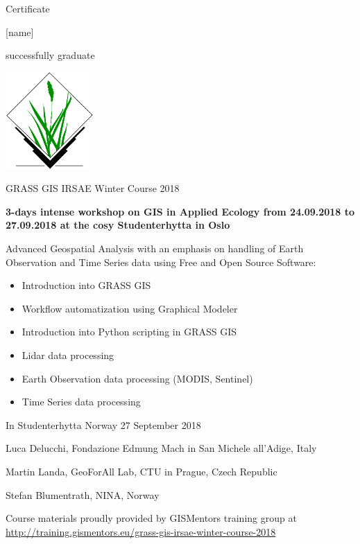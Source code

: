 \documentclass[12pt, a4paper]{letter}
\begin{document}
\pagestyle{empty}
\begin{center}

{\Huge Certificate}

{\Large [name]}

successfully graduate

\includegraphics[width=0.25\textwidth]{./grasslogo_vector.pdf}

{\Large GRASS GIS IRSAE Winter Course 2018}

{\bf 3-days intense workshop on GIS in Applied Ecology from 24.09.2018 to
27.09.2018 at the cosy Studenterhytta in Oslo}
\end{center}

Advanced Geospatial Analysis with an emphasis on handling of Earth
Observation and Time Series data using Free and Open Source Software:

\begin{itemize}
    \item Introduction into GRASS GIS
    \item Workflow automatization using Graphical Modeler
    \item Introduction into Python scripting in GRASS GIS
    \item Lidar data processing
    \item Earth Observation data processing (MODIS, Sentinel)
    \item Time Series data processing
\end{itemize}

\vfill

    In Studenterhytta Norway 27 September 2018\\

\vfill

    Luca Delucchi, Fondazione Edmung Mach in San Michele all’Adige, Italy

\vfill
    
    Martin Landa, GeoForAll Lab, CTU in Prague, Czech Republic
    
\vfill

    Stefan Blumentrath, NINA, Norway \\

\vfill

\begin{center}
{\footnotesize Course materials proudly provided by GISMentors
  training group at
  \url{http://training.gismentors.eu/grass-gis-irsae-winter-course-2018}}
\end{center}
\end{document}
